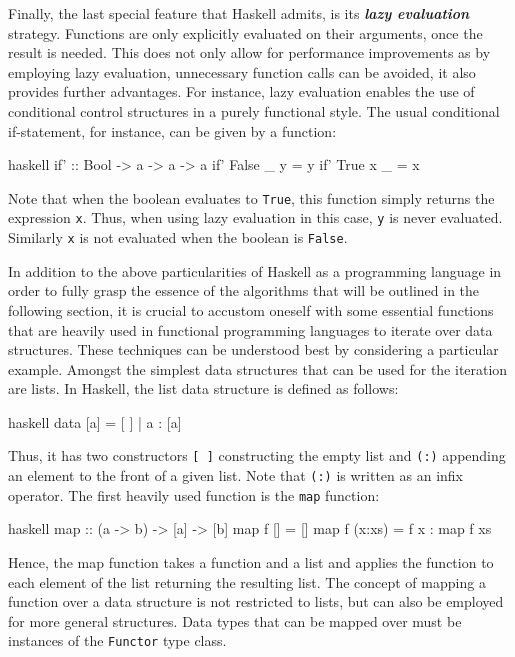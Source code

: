 Finally, the last special feature that Haskell admits, is its \textit{\textbf{lazy evaluation}} strategy. Functions are only explicitly evaluated on their arguments, once the result is needed. This does not only allow for performance improvements as by employing lazy evaluation, unnecessary function calls can be avoided, it also provides further advantages. For instance, lazy evaluation enables the use of conditional control structures in a purely functional style. The usual conditional if-statement, for instance, can be given by a function:
\begin{center}
\begin{cminted}{haskell}
if' :: Bool -> a -> a -> a
if' False _ y = y 
if' True x _ = x 
\end{cminted}
\end{center}
Note that when the boolean evaluates to \texttt{True}, this function simply returns the expression \texttt{x}. Thus, when using lazy evaluation in this case, \texttt{y} is never evaluated. Similarly \texttt{x} is not evaluated when the boolean is \texttt{False}. 

In addition to the above particularities of Haskell as a programming language in order to fully grasp the essence of the algorithms that will be outlined in the following section, it is crucial to accustom oneself with some essential functions that are heavily used in functional programming languages to iterate over data structures. These techniques can be understood best by considering a particular example. Amongst the simplest data structures that can be used for the iteration are lists. In Haskell, the list data structure is defined as follows: 
\begin{center}
\begin{cminted}{haskell}
data [a] = [ ] | a : [a] 
\end{cminted}
\end{center}
Thus, it has two constructors \texttt{[ ]} constructing the empty list and \texttt{(:)} appending an element to the front of a given list. Note that \texttt{(:)} is written as an infix operator.
The first heavily used function is the \texttt{map} function:
\begin{center}
\begin{cminted}{haskell}
map :: (a -> b) -> [a] -> [b]
map f [] = [] 
map f (x:xs) =  f x : map f xs 
\end{cminted}
\end{center}
Hence, the map function takes a function and a list and applies the function to each element of the list returning the resulting list.
The concept of mapping a function over a data structure is not restricted to lists, but can also be employed for more general structures. Data types that can be mapped over must be instances of the \texttt{Functor} type class.

